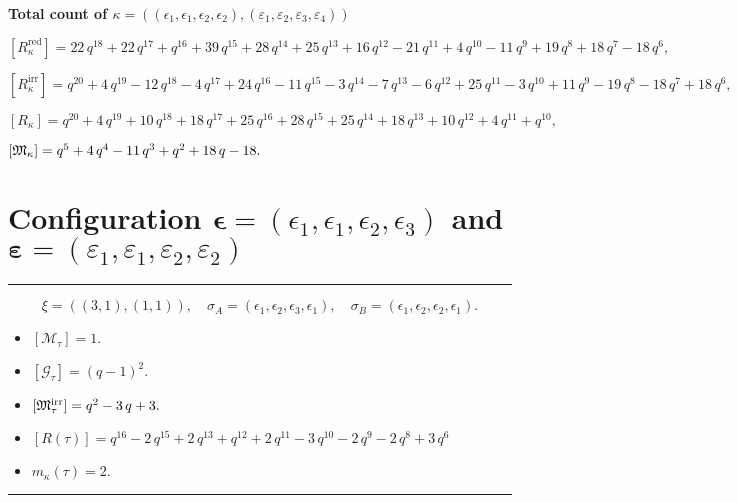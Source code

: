 \documentclass[10pt,a4paper]{amsart}
\begin{document}
\noindent\textbf{Total count of $\kappa = ((\epsilon_1,\epsilon_1,\epsilon_2,\epsilon_2), (\varepsilon_1,\varepsilon_2,\varepsilon_3,\varepsilon_4))$}\medskip

${[R_{\kappa}^{\textrm{red}}]} = 22 \, q^{18} + 22 \, q^{17} + q^{16} + 39 \, q^{15} + 28 \, q^{14} + 25 \, q^{13} + 16 \, q^{12} - 21 \, q^{11} + 4 \, q^{10} - 11 \, q^{9} + 19 \, q^{8} + 18 \, q^{7} - 18 \, q^{6} ,$

${[R_{\kappa}^{\textrm{irr}}]} = q^{20} + 4 \, q^{19} - 12 \, q^{18} - 4 \, q^{17} + 24 \, q^{16} - 11 \, q^{15} - 3 \, q^{14} - 7 \, q^{13} - 6 \, q^{12} + 25 \, q^{11} - 3 \, q^{10} + 11 \, q^{9} - 19 \, q^{8} - 18 \, q^{7} + 18 \, q^{6} ,$

${[R_{\kappa}]} = q^{20} + 4 \, q^{19} + 10 \, q^{18} + 18 \, q^{17} + 25 \, q^{16} + 28 \, q^{15} + 25 \, q^{14} + 18 \, q^{13} + 10 \, q^{12} + 4 \, q^{11} + q^{10} ,$

${[{\frak M}_{\kappa}]} = q^{5} + 4 \, q^{4} - 11 \, q^{3} + q^{2} + 18 \, q - 18 .$

\newpage{}

\section{Configuration $\bm{\epsilon} = (\epsilon_1,\epsilon_1,\epsilon_2,\epsilon_3)$ and $\bm{\varepsilon} =(\varepsilon_1,\varepsilon_1,\varepsilon_2,\varepsilon_2)$}
\noindent\rule{8cm}{0.4pt}

$$\xi = ({(3, 1), (1, 1)}),\quad \sigma_A = ({{\epsilon_1, \epsilon_2, \epsilon_3}, {\epsilon_1}}),\quad \sigma_B = ({{\epsilon_1, \epsilon_2, \epsilon_2}, {\epsilon_1}}).$$

\begin{itemize}
 \item $[\mathcal{M}_{\tau}] = 1 .$

 \item $[\mathcal{G}_{\tau}] = {\left(q - 1\right)}^{2} .$

 \item $[{\frak M}_{\tau}^{\textrm{irr}}] = q^{2} - 3 \, q + 3 .$

 \item $[R(\tau)] = q^{16} - 2 \, q^{15} + 2 \, q^{13} + q^{12} + 2 \, q^{11} - 3 \, q^{10} - 2 \, q^{9} - 2 \, q^{8} + 3 \, q^{6} $

 \item $m_{\kappa}(\tau) = 2 .$

 \end{itemize}
\noindent\rule{8cm}{0.4pt}
\end{document}
